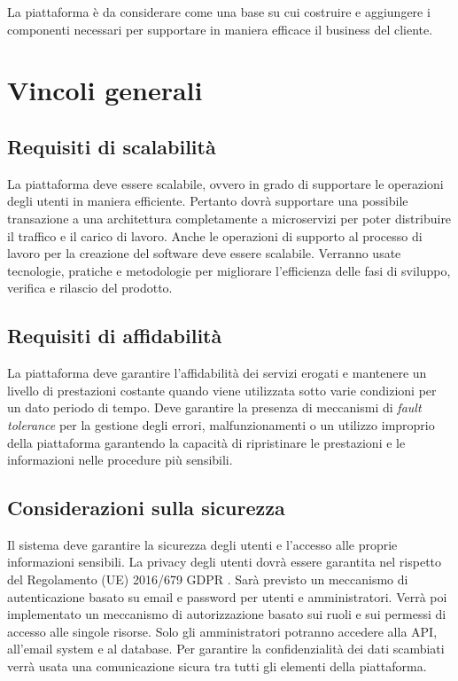 La piattaforma è da considerare come una base su cui costruire e aggiungere i componenti necessari per supportare in maniera efficace il business del
cliente.

\section{Vincoli generali}
\subsection{Requisiti di scalabilità}
La piattaforma deve essere scalabile, ovvero in grado di supportare le operazioni degli utenti
in maniera efficiente.
Pertanto dovrà supportare una possibile transazione a una architettura completamente a microservizi per poter distribuire il traffico e
il carico di lavoro.
Anche le operazioni di supporto al processo di lavoro per la creazione del software deve essere scalabile.
Verranno usate tecnologie, pratiche e metodologie per migliorare l'efficienza delle fasi di sviluppo, verifica e rilascio del prodotto.

\subsection{Requisiti di affidabilità}
La piattaforma deve garantire l'affidabilità dei servizi erogati e mantenere un livello di prestazioni
costante quando viene utilizzata sotto varie condizioni per un dato periodo di tempo.
Deve garantire la presenza di meccanismi di \textit{fault tolerance} per la gestione degli errori, malfunzionamenti o un utilizzo improprio della piattaforma
garantendo la capacità di ripristinare le prestazioni e le informazioni nelle procedure più sensibili.

\subsection{Considerazioni sulla sicurezza}
Il sistema deve garantire la sicurezza degli utenti e l’accesso alle proprie informazioni sensibili.
La privacy degli utenti dovrà essere garantita nel rispetto del Regolamento (UE) 2016/679 GDPR \cite{gdpr}.
Sarà previsto un meccanismo di autenticazione basato su email e password per utenti e amministratori.
Verrà poi implementato un meccanismo di autorizzazione basato sui ruoli e sui permessi di accesso alle singole risorse.
Solo gli amministratori potranno accedere alla API, all’email system e al database.
Per garantire la confidenzialità dei dati scambiati verrà usata una comunicazione sicura tra tutti gli elementi della piattaforma.

